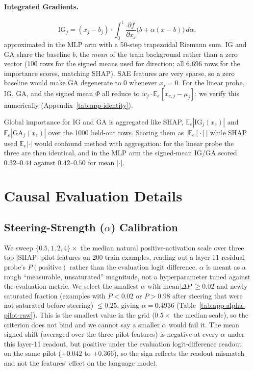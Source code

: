 \paragraph{Integrated Gradients.}
\label{app:ig}
\[
\mathrm{IG}_j = (x_j - b_j) \cdot \int_0^1 \frac{\partial f}{\partial x_j}\big(b + \alpha(x-b)\big)\, d\alpha,
\]
approximated in the MLP arm with a 50-step trapezoidal Riemann sum. IG and
GA share the baseline $b$, the \emph{mean} of the train background
rather than a zero vector (100 rows for the signed means used for direction;
all 6{,}696 rows for the importance scores, matching SHAP). SAE features are very sparse, so a zero
baseline would make GA degenerate to 0 whenever $x_j=0$. For the linear
probe, IG, GA, and the signed mean $\Phi$ all reduce to
$w_j \cdot \mathbb{E}_e[x_{e,j} - \mu_j]$; we verify this numerically
(Appendix~\ref{tab:app-identity}).

Global importance for IG and GA is aggregated like SHAP,
$\mathbb{E}_e|\mathrm{IG}_j(x_e)|$ and $\mathbb{E}_e|\mathrm{GA}_j(x_e)|$ over the
1000 held-out rows. Scoring them as $|\mathbb{E}_e[\cdot]|$ while SHAP used
$\mathbb{E}_e|\cdot|$ would confound method with aggregation: for the linear probe
the three are then identical, and in the MLP arm the signed-mean IG/GA scored
$0.32$--$0.44$ against $0.42$--$0.50$ for mean $|\cdot|$.

\clearpage
\section{Causal Evaluation Details}
\label{app:causal}

\subsection{Steering-Strength ($\alpha$) Calibration}
\label{app:alpha}
We sweep $\{0.5,1,2,4\}\times$ the median natural positive-activation scale
over three top-$|\mathrm{SHAP}|$ pilot features on 200 train examples,
reading out a layer-11 residual probe's $P(\text{positive})$ rather than
the evaluation logit difference. $\alpha$ is meant as a rough
``measurable, unsaturated'' magnitude, not a hyperparameter tuned against
the evaluation metric. We select the smallest $\alpha$ with
$\text{mean}|\Delta P| \geq 0.02$ and newly saturated fraction (examples
with $P<0.02$ or $P>0.98$ after steering that were not saturated before
steering) $\leq 0.25$, giving $\alpha=0.4936$
(Table~\ref{tab:app-alpha-pilot-raw}). This is the smallest value in the grid
($0.5\times$ the median scale), so the criterion does not bind and we cannot say a
smaller $\alpha$ would fail it. The mean signed shift (averaged over the three pilot
features) is negative at every $\alpha$ under this layer-11 readout, but positive
under the evaluation logit-difference readout on the same pilot ($+0.042$ to
$+0.366$), so the sign reflects the readout mismatch and not the features' effect
on the language model.


